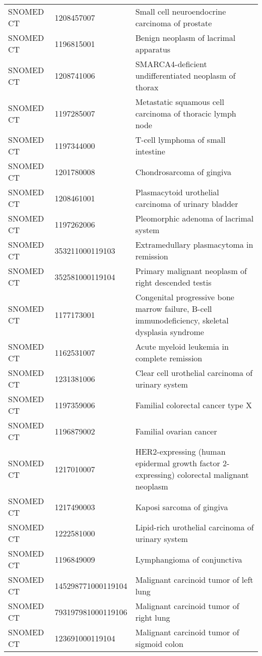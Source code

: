 \begin{longtable}{p{}p{}p{}}
  SNOMED CT & 1208457007 & Small cell neuroendocrine carcinoma of prostate \\ 
  SNOMED CT & 1196815001 & Benign neoplasm of lacrimal apparatus \\ 
  SNOMED CT & 1208741006 & SMARCA4-deficient undifferentiated neoplasm of thorax \\ 
  SNOMED CT & 1197285007 & Metastatic squamous cell carcinoma of thoracic lymph node \\ 
  SNOMED CT & 1197344000 & T-cell lymphoma of small intestine \\ 
  SNOMED CT & 1201780008 & Chondrosarcoma of gingiva \\ 
  SNOMED CT & 1208461001 & Plasmacytoid urothelial carcinoma of urinary bladder \\ 
  SNOMED CT & 1197262006 & Pleomorphic adenoma of lacrimal system \\ 
  SNOMED CT & 353211000119103 & Extramedullary plasmacytoma in remission \\ 
  SNOMED CT & 352581000119104 & Primary malignant neoplasm of right descended testis \\ 
  SNOMED CT & 1177173001 & Congenital progressive bone marrow failure, B-cell immunodeficiency, skeletal dysplasia syndrome \\ 
  SNOMED CT & 1162531007 & Acute myeloid leukemia in complete remission \\ 
  SNOMED CT & 1231381006 & Clear cell urothelial carcinoma of urinary system \\ 
  SNOMED CT & 1197359006 & Familial colorectal cancer type X \\ 
  SNOMED CT & 1196879002 & Familial ovarian cancer \\ 
  SNOMED CT & 1217010007 & HER2-expressing (human epidermal growth factor 2-expressing) colorectal malignant neoplasm \\ 
  SNOMED CT & 1217490003 & Kaposi sarcoma of gingiva \\ 
  SNOMED CT & 1222581000 & Lipid-rich urothelial carcinoma of urinary system \\ 
  SNOMED CT & 1196849009 & Lymphangioma of conjunctiva \\ 
  SNOMED CT & 145298771000119104 & Malignant carcinoid tumor of left lung \\ 
  SNOMED CT & 793197981000119106 & Malignant carcinoid tumor of right lung \\ 
  SNOMED CT & 123691000119104 & Malignant carcinoid tumor of sigmoid colon \\ 

\end{longtable}
